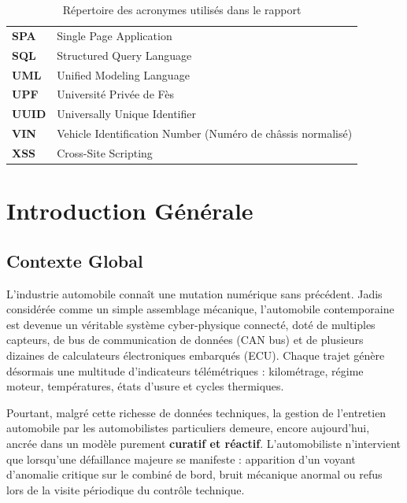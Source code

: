 \documentclass[12pt,a4paper,oneside]{report}
\begin{document}
\begin{table}[H]
\begin{tabularx}{\textwidth}{p{3.2cm} X}
\textbf{SPA} & Single Page Application \\
\textbf{SQL} & Structured Query Language \\
\textbf{UML} & Unified Modeling Language \\
\textbf{UPF} & Universit\'e Priv\'ee de F\`es \\
\textbf{UUID} & Universally Unique Identifier \\
\textbf{VIN} & Vehicle Identification Number (Num\'ero de ch\^assis normalis\'e) \\
\textbf{XSS} & Cross-Site Scripting \\
\bottomrule
\end{tabularx}
\caption*{R\'epertoire des acronymes utilis\'es dans le rapport}
\end{table}

\clearpage

\chapter*{Introduction G\'en\'erale}

\section*{Contexte Global}
L'industrie automobile conna\^it une mutation num\'erique sans pr\'ec\'edent. Jadis consid\'er\'ee comme un simple assemblage m\'ecanique, l'automobile contemporaine est devenue un v\'eritable syst\`eme cyber-physique connect\'e, dot\'e de multiples capteurs, de bus de communication de donn\'ees (CAN bus) et de plusieurs dizaines de calculateurs \'electroniques embarqu\'es (ECU). Chaque trajet g\'en\`ere d\'esormais une multitude d'indicateurs t\'el\'em\'etriques : kilom\'etrage, r\'egime moteur, temp\'eratures, \'etats d'usure et cycles thermiques.

Pourtant, malgr\'e cette richesse de donn\'ees techniques, la gestion de l'entretien automobile par les automobilistes particuliers demeure, encore aujourd'hui, ancr\'ee dans un mod\`ele purement \textbf{curatif et r\'eactif}. L'automobiliste n'intervient que lorsqu'une d\'efaillance majeure se manifeste : apparition d'un voyant d'anomalie critique sur le combin\'e de bord, bruit m\'ecanique anormal ou refus lors de la visite p\'eriodique du contr\^ole technique.
\end{document}
